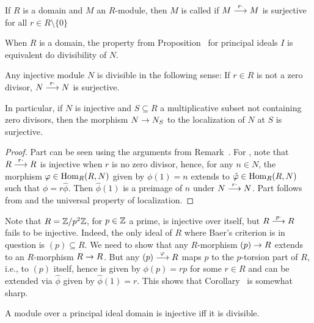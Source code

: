 \documentclass[a4paper,parskip=half,numbers=enddot, DIV=12]{scrreprt}
\begin{document}
\begin{defi}
	If $R$ is a domain and $M$ an $R$-module, then $M$ is called  if $M\morphism[r\cdot]M$ is surjective for all $r\in R\setminus\{0\}$
\end{defi}
\begin{cor}
	\begin{alphanumerate}
		\item {}When $R$ is a domain, the property from Proposition~ for principal ideals $I$ is equivalent do divisibility of $N$.
		\item Any injective module $N$ is divisible in the following sense: If $r\in R$ is not a zero divisor, $N\morphism[r\cdot]N$ is surjective.
		\item In particular, if $N$ is injective and $S\subseteq R$ a multiplicative subset not containing zero divisors, then the morphism $N\morphism N_S$ to the localization of $N$ at $S$ is surjective.
	\end{alphanumerate}
\end{cor}
\begin{proof}
	Part  can be seen using the arguments from Remark~. For , note that $R\morphism[r\cdot]R$ is injective when $r$ is no zero divisor, hence, for any $n\in N$, the morphism $\varphi\in\operatorname{Hom}_R(R,N)$ given by $\phi(1)=n$ extends to $\hat{\varphi}\in\operatorname{Hom}_R(R,N)$ such that $\phi=r\hat{\phi}$. Then $\hat{\phi}(1)$ is a preimage of $n$ under $N\morphism[r\cdot]N$. Part  follows from  and the universal property of localization.
\end{proof}
\begin{rem*}
	Note that $R=\mathbb{Z}/p^2\mathbb{Z}$, for $p\in\mathbb{Z}$ a prime, is injective over itself, but $R\morphism[p\cdot ]R$ fails to be injective. Indeed, the only ideal of $R$ where Baer's criterion is in question is $(p)\subseteq R$. We need to show that any $R$-morphism $(p)\morphism R$ extends to an $R$-morphism $R\morphism R$. But any $(p)\morphism[\phi] R$ maps $p$ to the $p$-torsion part of $R$, i.e., to $(p)$ itself, hence is given by $\phi(p)=rp$ for some $r\in R$ and can be extended via $\hat{\phi}$ given by $\hat{\phi}(1)=r$. This shows that Corollary~ is somewhat sharp.
\end{rem*}
\begin{cor}
	A module over a principal ideal domain is injective iff it is divisible.
\end{cor}
\end{document}
